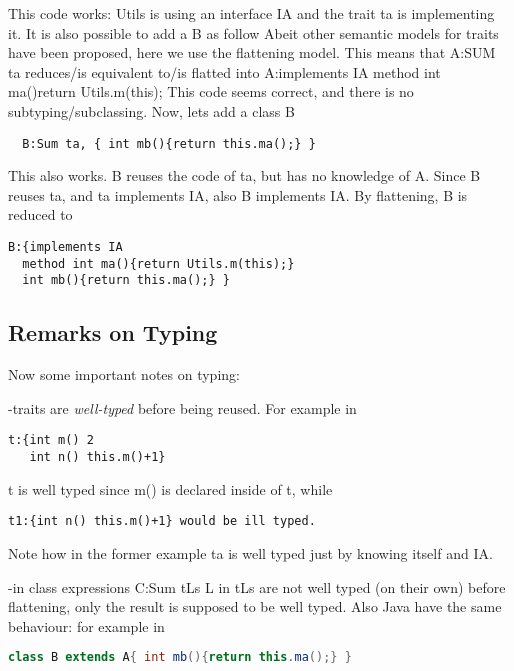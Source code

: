 \documentclass{llncs}
\begin{document}
This code works: Utils is using an interface IA and the trait ta
is implementing it. It is also possible to add a B as follow
Abeit other semantic models for traits~\cite{} have been proposed,
here we use the flattening model.
This means that 
 A:SUM ta
  reduces/is equivalent to/is flatted into
 A:{implements IA method int ma(){return Utils.m(this);} }
This code seems correct, and there is no subtyping/subclassing.
Now, lets add a class B

\begin{lstlisting}
  B:Sum ta, { int mb(){return this.ma();} }
\end{lstlisting}

This also works.  B reuses the code of ta, but has no knowledge of A.
Since B reuses ta, and ta implements IA, also B implements IA.  By
flattening, B is reduced to

\begin{lstlisting}
B:{implements IA
  method int ma(){return Utils.m(this);}
  int mb(){return this.ma();} } 
\end{lstlisting}

\subsection{Remarks on Typing}

Now some important notes on typing:

-traits are \emph{well-typed} before being reused. For example in

\begin{lstlisting}
t:{int m() 2 
   int n() this.m()+1}
\end{lstlisting}

\noindent t is well typed since m() is declared inside of t, while

\begin{lstlisting}
t1:{int n() this.m()+1} would be ill typed.
\end{lstlisting}

\noindent Note how in the former example ta is well typed just by knowing itself and IA.

-in class expressions C:Sum tLs
L in tLs are not well typed (on their own) before flattening, only
the result is supposed to be well typed.
Also Java have the same behaviour:
for example in

\begin{lstlisting}[language=Java]
  class B extends A{ int mb(){return this.ma();} }
\end{lstlisting}
\end{document}
